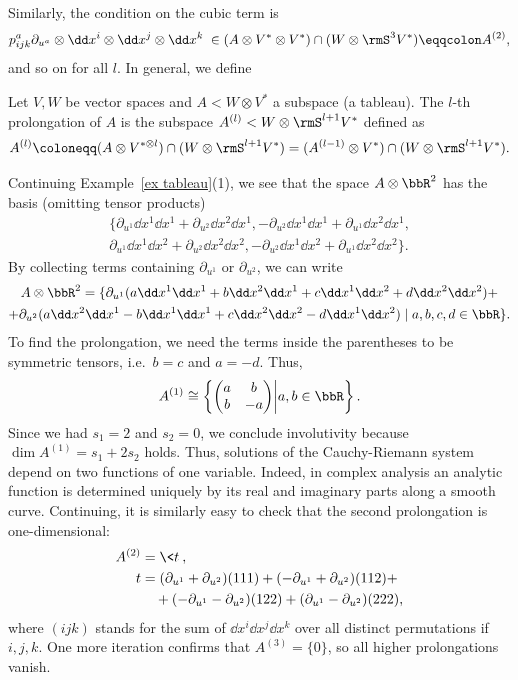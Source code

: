 Similarly, the condition on the cubic term is 
\[p^a_{ijk}\partial_{u^a}\otimes \dd x^i\otimes\dd x^j\otimes\dd x^k\; \in(A\otimes V^\ast\otimes V^\ast)\cap (W\otimes \rmS^3 V^\ast)\eqqcolon A^{(2)},\]
and so on for all $l$. In general, we define 

\begin{defn}[Prolongation]
    Let $V,W$ be vector spaces and $A<W\otimes V^\ast$ a subspace (a tableau). The $l$-th prolongation of $A$ is the subspace $A^{(l)}<W\otimes \rmS^{l+1}V^\ast$ defined as
    \[A^{(l)}\coloneqq (A\otimes V^{\ast\otimes l})\cap (W\otimes \rmS^{l+1} V^\ast)=(A^{(l-1)}\otimes V^\ast)\cap (W\otimes \rmS^{l+1} V^\ast).\]
\end{defn}

\begin{example}
    Continuing Example~\ref{ex tableau}(1), we see that the space $A\otimes \bbR^2$ has the basis (omitting tensor products)
    \begin{multline}
        \{\partial_{u^1}\dd x^1\dd x^1+\partial_{u^2}\dd x^2\dd x^1,-\partial_{u^2}\dd x^1\dd x^1+\partial_{u^1}\dd x^2\dd x^1,\\
        \partial_{u^1}\dd x^1\dd x^2+\partial_{u^2}\dd x^2\dd x^2, -\partial_{u^2}\dd x^1\dd x^2+\partial_{u^1}\dd x^2\dd x^2\}.
    \end{multline}
    By collecting terms containing $\partial_{u^1}$ or $\partial_{u^2}$, we can write 
    \begin{multline}
        A\otimes\bbR^2=\{\partial_{u^1}(a\dd x^1\dd x^1+b \dd x^2\dd x^1+c\dd x^1\dd x^2+d\dd x^2\dd x^2)+\\
        +\partial_{u^2}(a\dd x^2\dd x^1-b \dd x^1\dd x^1+c\dd x^2\dd x^2-d\dd x^1\dd x^2)\mid a,b,c,d\in\bbR\}.
    \end{multline}
    To find the prolongation, we need the terms inside the parentheses to be symmetric tensors, i.e.\ $b=c$ and $a=-d$. Thus,
    \[A^{(1)}\cong \left\{
        \begin{pmatrix}
            a&b\\b&-a
        \end{pmatrix}\middle| a,b\in\bbR
    \right\}.\]
    Since we had $s_1=2$ and $s_2=0$, we conclude involutivity because $\dim A^{(1)}=s_1+2s_2$ holds. Thus, solutions of the Cauchy-Riemann system depend on two functions of one variable. Indeed, in complex analysis an analytic function is determined uniquely by its real and imaginary parts along a smooth curve. Continuing, it is similarly easy to check that the second prolongation is one-dimensional:
    \begin{align}
        A^{(2)}&=\<t\>,\\
        t&=(\partial_{u^1}+\partial_{u^2})(111)+(-\partial_{u^1}+\partial_{u^2})(112)+\\
        &\quad +(-\partial_{u^1}-\partial_{u^2})(122)+(\partial_{u^1}-\partial_{u^2})(222),
    \end{align}
    where $(ijk)$ stands for the sum of $\dd x^i\dd x^j\dd x^k$ over all distinct permutations if $i,j,k$. One more iteration confirms that $A^{(3)}=\{0\}$, so all higher prolongations vanish.
\end{example}


